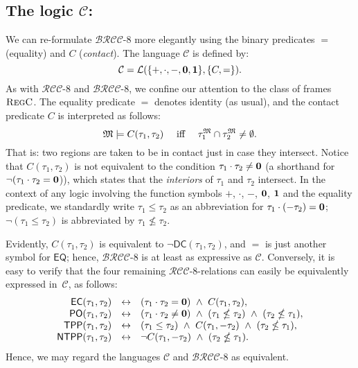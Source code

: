 \documentclass{LMCS}
\theoremstyle{plain}
\newcommand{\cBC}{\ensuremath{\mathcal{C}}}
\newcommand{\BRCCE}{\ensuremath{\mathcal{BRCC}\text{-}8}}
\newcommand{\RCCE}{\ensuremath{\mathcal{RCC}\text{-}8}}\newcommand{\RCCEcc}{\ensuremath{\RCCE{}cc}}\newcommand{\RCCEc}{\ensuremath{\RCCE{}c}}
\newcommand{\Regc}{\textsc{RegC}}
\begin{document}
\subsection*{The logic $\cBC$:}
We can re-formulate $\BRCCE$ more elegantly using the binary
predicates $=$ (equality) and $C$ (\emph{contact}).  The language
$\cBC$ is defined by:
\begin{equation*}
\cBC = \cL(\{+, \cdot, -, \zero, \one \}, \{C, =\}).
\end{equation*}
As with $\RCCE$ and $\BRCCE$, we confine our attention to the class of
frames $\Regc$. The equality predicate $=$ denotes identity (as
usual), and the contact predicate $C$ is interpreted as follows:
\begin{equation*}
\mathfrak{M} \models C(\tau_1, \tau_2) \quad \mbox{ iff } \quad
\tau_1^{\mathfrak{M}} \cap \tau_2^{\mathfrak{M}} \neq \emptyset.
\end{equation*}
That is: two regions are taken to be in contact just in case they
intersect.  Notice that $C(\tau_1,\tau_2)$ is not equivalent to the
condition $\tau_1 \cdot \tau_2 \neq \mathbf{0}$ (a shorthand for
$\neg(\tau_1 \cdot \tau_2 = \mathbf{0}$)), which states that the
\emph{interiors} of $\tau_1$ and $\tau_2$ intersect.  In the context
of any logic involving the function symbols $+$, $\cdot$, $-$,
$\mathbf{0}$, $\mathbf{1}$ and the equality predicate, we standardly write
$\tau_1 \leq \tau_2$ as an abbreviation for $\tau_1 \cdot
(-\tau_2) = \mathbf{0}$;  $\neg(\tau_1 \leq \tau_2)$ is abbreviated by $\tau_1 \nleq \tau_2$.

Evidently, $C(\tau_1,\tau_2)$ is equivalent to $\neg
\mathsf{DC}(\tau_1,\tau_2)$, and $=$ is just another symbol for $\mathsf{EQ}$; hence, $\BRCCE$ is at least as
expressive as $\cBC$. Conversely, it is easy to verify that the four
remaining $\RCCE$-relations can easily be equivalently expressed in~$\cBC$, as follows:
\begin{equation*}
\begin{array}{rll}
{\sf EC}(\tau_1,\tau_2) &\leftrightarrow & (\tau_1 \cdot \tau_2 = \mathbf{0}) \ \wedge \ C(\tau_1,\tau_2),\\
{\sf PO}(\tau_1,\tau_2) &\leftrightarrow & (\tau_1 \cdot \tau_2 \neq \mathbf{0}) \ \wedge \ (\tau_1 \nleq \tau_2) \ \land \ (\tau_2 \nleq \tau_1),\\
{\sf TPP}(\tau_1,\tau_2) &\leftrightarrow &
(\tau_1 \leq \tau_2) \ \wedge \ C(\tau_1, -\tau_2) \  \land \ (\tau_2 \nleq \tau_1),\\
{\sf NTPP}(\tau_1,\tau_2) &\leftrightarrow & \neg C(\tau_1,-\tau_2) \ \land \ (\tau_2 \nleq \tau_1).
\end{array}\end{equation*}
Hence, we may regard the languages $\cBC$ and $\BRCCE$ as equivalent.
\end{document}
